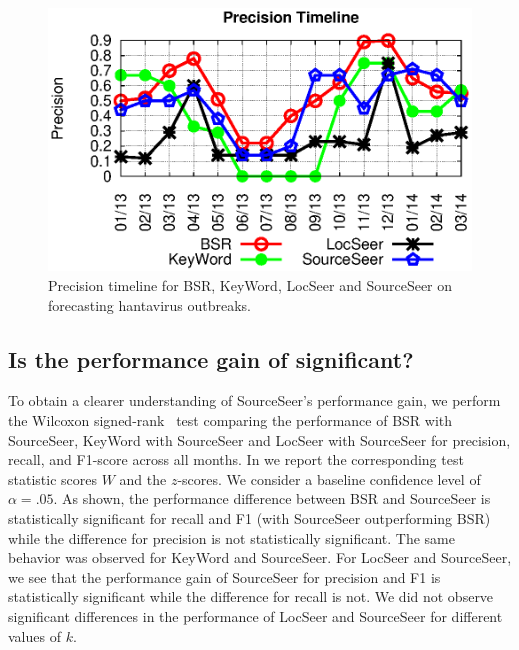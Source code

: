 \documentclass[twoside,leqno,twocolumn]{article}
\newcommand{\fullmodel}{{{\sf SourceSeer}}\xspace}
\newcommand{\locationmodel}{{\sf LocSeer}\xspace}
\newcommand{\keymodel}{{\sf KeyWord}\xspace}
\begin{document}
\begin{figure}
\begin{center}
	\includegraphics[clip,scale=0.63]{fig/prec_timeline.eps}
\end{center}
\caption{Precision timeline for BSR, \keymodel, \locationmodel and \fullmodel on forecasting hantavirus outbreaks.}
 \label{fig:prec_timeline}
\end{figure}

\subsection{Is the performance gain of {} significant?} To obtain a clearer understanding of \fullmodel's performance gain, we perform the Wilcoxon signed-rank~\cite{Wilcoxon45} test comparing the performance of  BSR with \fullmodel,  \keymodel with \fullmodel and \locationmodel with \fullmodel for precision, recall, and F1-score across all months. In  we report the corresponding test statistic scores $W$ and the $z$-scores. We consider a baseline confidence level of $\alpha = .05$. As shown, the performance difference between BSR and \fullmodel is statistically significant for recall and F1 (with \fullmodel outperforming BSR) while the difference for precision is not statistically significant. The same behavior was observed for \keymodel and \fullmodel. For \locationmodel and \fullmodel, we see that the performance gain of \fullmodel for precision and F1 is statistically significant while the difference for recall is not. We did not observe significant differences in the performance of \locationmodel and \fullmodel for different values of $k$. 
\end{document}
